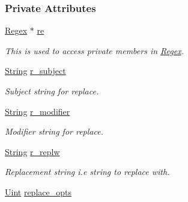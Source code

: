 \subsubsection*{Private Attributes}
\begin{DoxyCompactItemize}
\item 
\hyperlink{classjpcre2_1_1Regex}{Regex} $\ast$ \hyperlink{classjpcre2_1_1RegexReplace_ab8adfdb3aade18fe6bff03fb3262c396}{re}\hypertarget{classjpcre2_1_1RegexReplace_ab8adfdb3aade18fe6bff03fb3262c396}{}\label{classjpcre2_1_1RegexReplace_ab8adfdb3aade18fe6bff03fb3262c396}

\begin{DoxyCompactList}\small\item\em This is used to access private members in \hyperlink{classjpcre2_1_1Regex}{Regex}. \end{DoxyCompactList}\item 
\hyperlink{namespacejpcre2_a91f03070152fb228bc116c5a737f1d16}{String} \hyperlink{classjpcre2_1_1RegexReplace_a2290e5d9f1c2336abd431fef97e72c93}{r\+\_\+subject}\hypertarget{classjpcre2_1_1RegexReplace_a2290e5d9f1c2336abd431fef97e72c93}{}\label{classjpcre2_1_1RegexReplace_a2290e5d9f1c2336abd431fef97e72c93}

\begin{DoxyCompactList}\small\item\em Subject string for replace. \end{DoxyCompactList}\item 
\hyperlink{namespacejpcre2_a91f03070152fb228bc116c5a737f1d16}{String} \hyperlink{classjpcre2_1_1RegexReplace_a3e6b848c7ad8f53cc17f49a6038930ec}{r\+\_\+modifier}\hypertarget{classjpcre2_1_1RegexReplace_a3e6b848c7ad8f53cc17f49a6038930ec}{}\label{classjpcre2_1_1RegexReplace_a3e6b848c7ad8f53cc17f49a6038930ec}

\begin{DoxyCompactList}\small\item\em Modifier string for replace. \end{DoxyCompactList}\item 
\hyperlink{namespacejpcre2_a91f03070152fb228bc116c5a737f1d16}{String} \hyperlink{classjpcre2_1_1RegexReplace_a73d0da1aac8b83a0a47b24629b5013f4}{r\+\_\+replw}\hypertarget{classjpcre2_1_1RegexReplace_a73d0da1aac8b83a0a47b24629b5013f4}{}\label{classjpcre2_1_1RegexReplace_a73d0da1aac8b83a0a47b24629b5013f4}

\begin{DoxyCompactList}\small\item\em Replacement string i.\+e string to replace with. \end{DoxyCompactList}\item 
\hyperlink{namespacejpcre2_a078242d38221a13fb3543b9edd78c099}{Uint} \hyperlink{classjpcre2_1_1RegexReplace_afc79699cfcad8b7cbb26864b6b67cdc7}{replace\+\_\+opts}\hypertarget{classjpcre2_1_1RegexReplace_afc79699cfcad8b7cbb26864b6b67cdc7}{}\label{classjpcre2_1_1RegexReplace_afc79699cfcad8b7cbb26864b6b67cdc7}


\end{DoxyCompactItemize}
